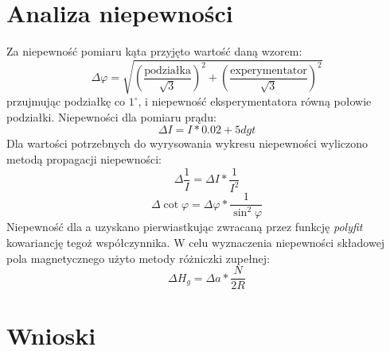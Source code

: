 \documentclass[a4paper,10pt]{article}
\begin{document}
\section{Analiza niepewności}
Za niepewność pomiaru kąta przyjęto wartość daną wzorem:
\begin{equation}
  \Delta \varphi = \sqrt{(\frac{\text{podziałka}}{\sqrt{3}})^2+(\frac{\text{experymentator}}{\sqrt{3}})^2}
\end{equation}
przujmując podziałkę co $1^\circ$, i niepewność eksperymentatora równą połowie podziałki.
Niepewności dla pomiaru prądu:
\begin{equation}
  \Delta I = I*0.02+5dgt
\end{equation}
Dla wartości potrzebnych do wyrysowania wykresu niepewności wyliczono metodą propagacji niepewności:\\
\begin{equation}
  \Delta \frac{1}{I} = \Delta I * \frac{1}{I^2}
\end{equation}
\begin{equation}
  \Delta \cot{\varphi} = \Delta \varphi * \frac{1}{\sin^2{\varphi}}
\end{equation}
Niepewność dla a uzyskano pierwiastkując zwracaną przez funkcję \emph{polyfit} kowariancję tegoż współczynnika. W celu wyznaczenia niepewności składowej pola
magnetycznego użyto %
metody różniczki zupełnej:
\begin{equation}
  \Delta H_g = \Delta a * \frac{N}{2R}%
\end{equation}
\section{Wnioski}
\end{document}

